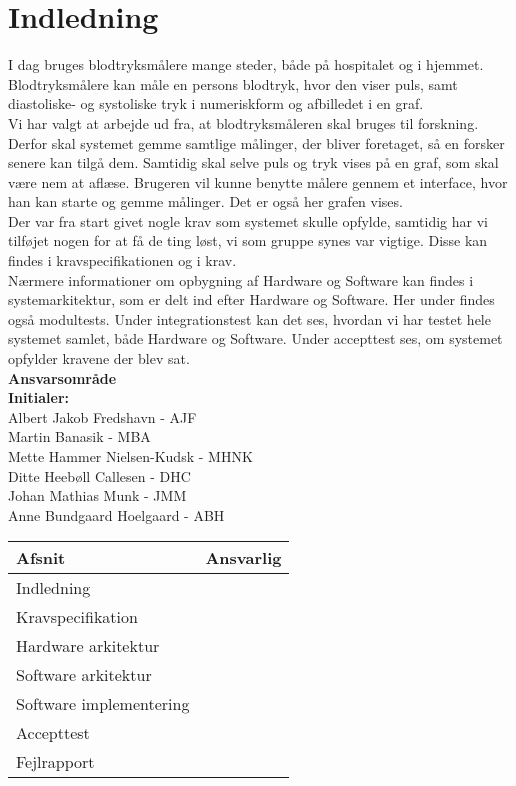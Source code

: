 \chapter{Indledning}
I dag bruges blodtryksmålere mange steder, både på hospitalet og i hjemmet. Blodtryksmålere kan måle en persons blodtryk, hvor den viser puls, samt diastoliske- og systoliske tryk i numeriskform og afbilledet i en graf.\\ 
Vi har valgt at arbejde ud fra, at blodtryksmåleren skal bruges til forskning. Derfor skal systemet gemme samtlige målinger, der bliver foretaget, så en forsker senere kan tilgå dem. Samtidig skal selve puls og tryk vises på en graf, som skal være nem at aflæse. Brugeren vil kunne benytte målere gennem et interface, hvor han kan starte og gemme målinger. Det er også her grafen vises. \\
Der var fra start givet nogle krav som systemet skulle opfylde, samtidig har vi tilføjet nogen for at få de ting løst, vi som gruppe synes var vigtige. Disse kan findes i kravspecifikationen og i krav.\\
Nærmere informationer om opbygning af Hardware og Software kan findes i systemarkitektur, som er delt ind efter Hardware og Software. Her under findes også modultests. 
Under integrationstest kan det ses, hvordan vi har testet hele systemet samlet, både Hardware og Software. Under accepttest ses, om systemet opfylder kravene der blev sat.\\ 


\textbf{Ansvarsområde} \\
\textbf{Initialer: } \\
Albert Jakob Fredshavn - AJF \\
Martin Banasik - MBA \\
Mette Hammer Nielsen-Kudsk - MHNK \\
Ditte Heebøll Callesen - DHC \\
Johan Mathias Munk - JMM \\
Anne Bundgaard Hoelgaard - ABH \\


\begin{longtabu} to 
    Afsnit &    Ansvarlig\\[-1ex]
    \midrule
    Indledning & \\
    Kravspecifikation & \\
    Hardware arkitektur & \\
    Software arkitektur & \\
    Software implementering & \\
    Accepttest & \\
    Fejlrapport & \\
    
    
    

\end{longtabu}
